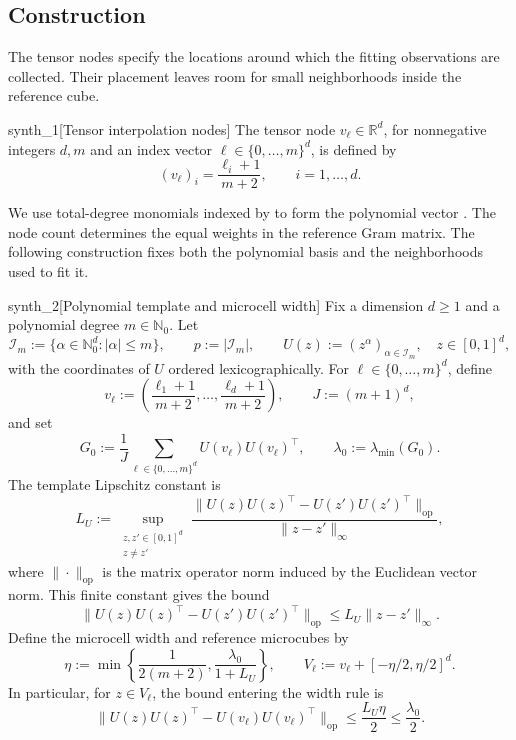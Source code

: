 \documentclass[11pt]{article}
\begin{document}
\subsection{Construction}

The tensor nodes  specify the locations around which the fitting observations are collected. Their placement leaves room for small neighborhoods inside the reference cube.

\begin{definitionv}{synth_1}[Tensor interpolation nodes]
The tensor node \(v_\ell\in\mathbb R^d\), for nonnegative integers \(d,m\) and an index vector \(\ell\in\{0,\ldots,m\}^d\), is defined by
\[
(v_\ell)_i=\frac{\ell_i+1}{m+2},
\qquad i=1,\ldots,d.
\]
\end{definitionv}

We use total-degree monomials indexed by  to form the polynomial vector . The node count  determines the equal weights in the reference Gram matrix. The following construction fixes both the polynomial basis and the neighborhoods used to fit it.

\begin{definitionv}{synth_2}[Polynomial template and microcell width]
Fix a dimension \(d\ge1\) and a polynomial degree \(m\in\mathbb N_0\). Let
\[
\mathcal I_m:=\{\alpha\in\mathbb N_0^d:|\alpha|\le m\},
\qquad p:=|\mathcal I_m|,
\qquad U(z):=(z^\alpha)_{\alpha\in\mathcal I_m},
\quad z\in[0,1]^d,
\]
with the coordinates of \(U\) ordered lexicographically. For
\(\ell\in\{0,\ldots,m\}^d\), define
\[
v_\ell:=\left(\frac{\ell_1+1}{m+2},\ldots,
\frac{\ell_d+1}{m+2}\right),
\qquad J:=(m+1)^d,
\]
and set
\[
G_0:=\frac1J\sum_{\ell\in\{0,\ldots,m\}^d}
U(v_\ell)U(v_\ell)^\top,
\qquad \lambda_0:=\lambda_{\min}(G_0).
\]
The template Lipschitz constant is
\[
L_U:=
\sup_{\substack{z,z'\in[0,1]^d\\z\ne z'}}
\frac{\|U(z)U(z)^\top-U(z')U(z')^\top\|_{\mathrm{op}}}
{\|z-z'\|_\infty},
\]
where \(\|\cdot\|_{\mathrm{op}}\) is the matrix operator norm induced by the Euclidean vector norm. This finite constant gives the bound
\[
\|U(z)U(z)^\top-U(z')U(z')^\top\|_{\mathrm{op}}
\le L_U\|z-z'\|_\infty.
\]
Define the microcell width and reference microcubes by
\[
\eta:=\min\left\{\frac1{2(m+2)},\frac{\lambda_0}{1+L_U}\right\},
\qquad
V_\ell:=v_\ell+[-\eta/2,\eta/2]^d.
\]
In particular, for \(z\in V_\ell\), the bound entering the width rule is
\[
\|U(z)U(z)^\top-U(v_\ell)U(v_\ell)^\top\|_{\mathrm{op}}
\le \frac{L_U\eta}{2}\le\frac{\lambda_0}{2}.
\]
\end{definitionv}
\end{document}
